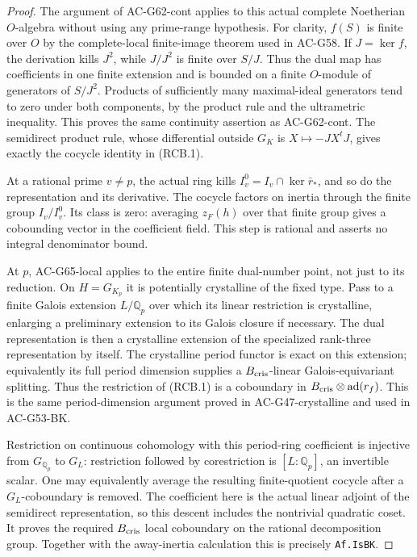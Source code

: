 \begin{proof}
The argument of AC-G62-cont applies to this actual complete
Noetherian \(O\)-algebra without using any prime-range hypothesis.
For clarity, \(f(S)\) is finite over \(O\) by the complete-local
finite-image theorem used in AC-G58. If \(J=\ker f\), the
derivation kills \(J^2\), while \(J/J^2\) is finite over
\(S/J\). Thus the dual map has coefficients in one finite
extension and is bounded on a finite \(O\)-module of generators
of \(S/J^2\). Products of sufficiently many maximal-ideal
generators tend to zero under both components, by the product
rule and the ultrametric inequality. This proves the same
continuity assertion as AC-G62-cont. The semidirect product
rule, whose differential outside \(G_K\) is
\(X\mapsto-JX^tJ\), gives exactly the cocycle identity in
(RCB.1).

At a rational prime \(v\ne p\), the actual ring kills
\(I_v^0=I_v\cap\ker\bar r_*\), and so do the representation
and its derivative. The cocycle factors on inertia through
the finite group \(I_v/I_v^0\). Its class is zero: averaging
\(z_F(h)\) over that finite group gives a cobounding vector
in the coefficient field. This step is rational and asserts
no integral denominator bound.

At \(p\), AC-G65-local applies to the entire finite
dual-number point, not just to its reduction. On
\(H=G_{K_p}\) it is potentially crystalline of the fixed
type. Pass to a finite Galois extension \(L/\mathbb Q_p\)
over which its linear restriction is crystalline, enlarging
a preliminary extension to its Galois closure if necessary.
The dual representation is then a crystalline extension of
the specialized rank-three representation by itself.
The crystalline period functor is exact on this extension;
equivalently its full period dimension supplies a
\(B_{\rm cris}\)-linear Galois-equivariant splitting.
Thus the restriction of (RCB.1) is a coboundary in
\(B_{\rm cris}\otimes\operatorname{ad}(r_f)\).
This is the same period-dimension argument proved in
AC-G47-crystalline and used in AC-G53-BK.

Restriction on continuous cohomology with this period-ring
coefficient is injective from \(G_{\mathbb Q_p}\) to
\(G_L\): restriction followed by corestriction is
\([L:\mathbb Q_p]\), an invertible scalar. One may equivalently
average the resulting finite-quotient cocycle after a
\(G_L\)-coboundary is removed. The coefficient here is the
actual linear adjoint of the semidirect representation, so
this descent includes the nontrivial quadratic coset.
It proves the required \(B_{\rm cris}\) local coboundary on
the rational decomposition group. Together with the
away-inertia calculation this is precisely \texttt{Af.IsBK}.
\end{proof}

